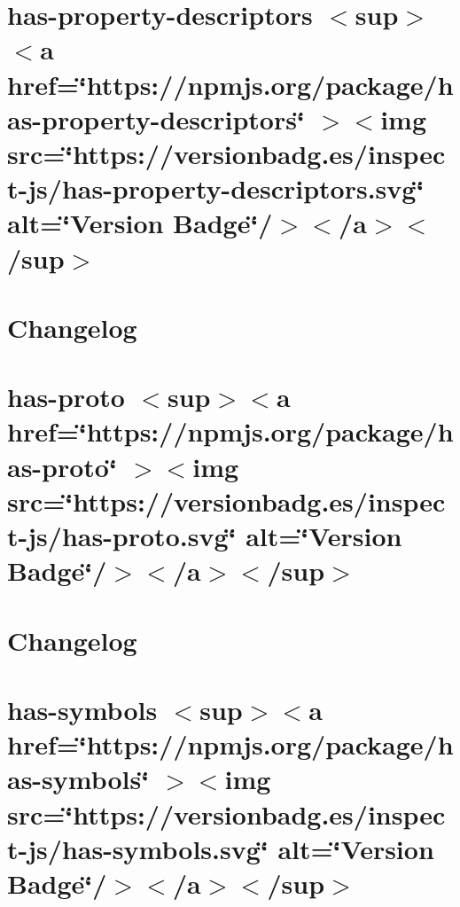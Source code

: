 \documentclass[twoside]{book}
\newcommand{\+}{\discretionary{\mbox{\scriptsize$\hookleftarrow$}}{}{}}
\begin{document}
\chapter{has-\/property-\/descriptors \texorpdfstring{$<$}{<}sup\texorpdfstring{$>$}{>}\texorpdfstring{$<$}{<}a href=\char`\"{}https\+://npmjs.\+org/package/has-\/property-\/descriptors\char`\"{} \texorpdfstring{$>$}{>}\texorpdfstring{$<$}{<}img src=\char`\"{}https\+://versionbadg.\+es/inspect-\/js/has-\/property-\/descriptors.\+svg\char`\"{} alt=\char`\"{}\+Version Badge\char`\"{}/\texorpdfstring{$>$}{>}\texorpdfstring{$<$}{<}/a\texorpdfstring{$>$}{>}\texorpdfstring{$<$}{<}/sup\texorpdfstring{$>$}{>}}
\label{md_Backend_nodejs_node_modules_has_property_descriptors_README}

\chapter{Changelog}
\label{md_Backend_nodejs_node_modules_has_proto_CHANGELOG}

\chapter{has-\/proto \texorpdfstring{$<$}{<}sup\texorpdfstring{$>$}{>}\texorpdfstring{$<$}{<}a href=\char`\"{}https\+://npmjs.\+org/package/has-\/proto\char`\"{} \texorpdfstring{$>$}{>}\texorpdfstring{$<$}{<}img src=\char`\"{}https\+://versionbadg.\+es/inspect-\/js/has-\/proto.\+svg\char`\"{} alt=\char`\"{}\+Version Badge\char`\"{}/\texorpdfstring{$>$}{>}\texorpdfstring{$<$}{<}/a\texorpdfstring{$>$}{>}\texorpdfstring{$<$}{<}/sup\texorpdfstring{$>$}{>}}
\label{md_Backend_nodejs_node_modules_has_proto_README}

\chapter{Changelog}
\label{md_Backend_nodejs_node_modules_has_symbols_CHANGELOG}

\chapter{has-\/symbols \texorpdfstring{$<$}{<}sup\texorpdfstring{$>$}{>}\texorpdfstring{$<$}{<}a href=\char`\"{}https\+://npmjs.\+org/package/has-\/symbols\char`\"{} \texorpdfstring{$>$}{>}\texorpdfstring{$<$}{<}img src=\char`\"{}https\+://versionbadg.\+es/inspect-\/js/has-\/symbols.\+svg\char`\"{} alt=\char`\"{}\+Version Badge\char`\"{}/\texorpdfstring{$>$}{>}\texorpdfstring{$<$}{<}/a\texorpdfstring{$>$}{>}\texorpdfstring{$<$}{<}/sup\texorpdfstring{$>$}{>}}
\label{md_Backend_nodejs_node_modules_has_symbols_README}

\end{document}
